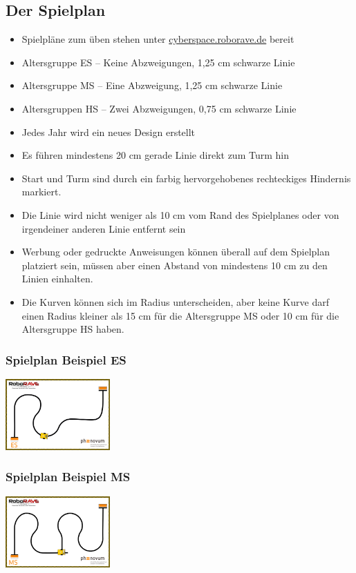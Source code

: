 \documentclass[a4paper,12pt]{article}
\begin{document}
\subsection{Der Spielplan}

\begin{itemize}
	\item Spielpläne zum üben stehen unter
\href{https://www.cyberspace.roborave.de/lab/}{cyberspace.roborave.de} bereit
	\item Altersgruppe ES – Keine Abzweigungen, 1,25 cm schwarze Linie
	\item Altersgruppe MS – Eine Abzweigung, 1,25 cm schwarze Linie
	\item Altersgruppen HS – Zwei Abzweigungen, 0,75 cm schwarze Linie
	\item Jedes Jahr wird ein neues Design erstellt
	\item Es führen mindestens 20 cm gerade Linie direkt zum Turm hin
	\item Start und Turm sind durch ein farbig hervorgehobenes rechteckiges
		 Hindernis markiert.
	\item Die Linie wird nicht weniger als 10 cm vom Rand des Spielplanes
		oder von irgendeiner anderen Linie entfernt sein
	\item Werbung oder gedruckte Anweisungen können überall auf dem
		Spielplan platziert sein, müssen aber einen Abstand von
		mindestens 10 cm zu den Linien einhalten.
	\item Die Kurven können sich im Radius unterscheiden, aber keine Kurve
darf einen Radius kleiner als 15 cm für die Altersgruppe MS oder 10 cm für die
Altersgruppe HS haben.
\end{itemize}

\subsubsection{Spielplan Beispiel ES}
\includegraphics[width=0.3\textwidth]{images/cyberspace/linefollowing_es.png}

\subsubsection{Spielplan Beispiel MS}
\includegraphics[width=0.3\textwidth]{images/cyberspace/linefollowing_ms.png}
\end{document}
